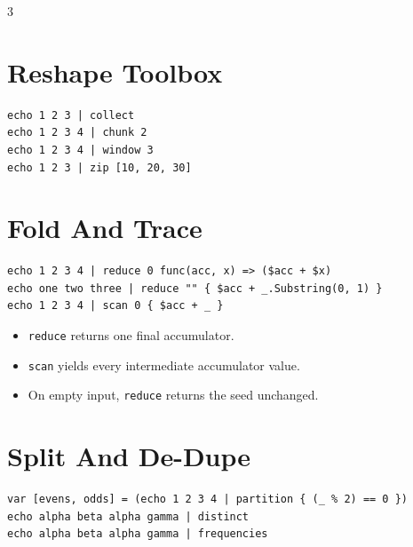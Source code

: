 \begin{multicols*}{3}

\section{Reshape Toolbox}

\begin{lstlisting}
echo 1 2 3 | collect
echo 1 2 3 4 | chunk 2
echo 1 2 3 4 | window 3
echo 1 2 3 | zip [10, 20, 30]
\end{lstlisting}

\section{Fold And Trace}
\begin{lstlisting}
echo 1 2 3 4 | reduce 0 func(acc, x) => ($acc + $x)
echo one two three | reduce "" { $acc + _.Substring(0, 1) }
echo 1 2 3 4 | scan 0 { $acc + _ }
\end{lstlisting}

\begin{itemize}
\item \texttt{reduce} returns one final accumulator.
\item \texttt{scan} yields every intermediate accumulator value.
\item On empty input, \texttt{reduce} returns the seed unchanged.
\end{itemize}

\section{Split And De-Dupe}
\begin{lstlisting}
var [evens, odds] = (echo 1 2 3 4 | partition { (_ % 2) == 0 })
echo alpha beta alpha gamma | distinct
echo alpha beta alpha gamma | frequencies
\end{lstlisting}


\end{multicols*}
